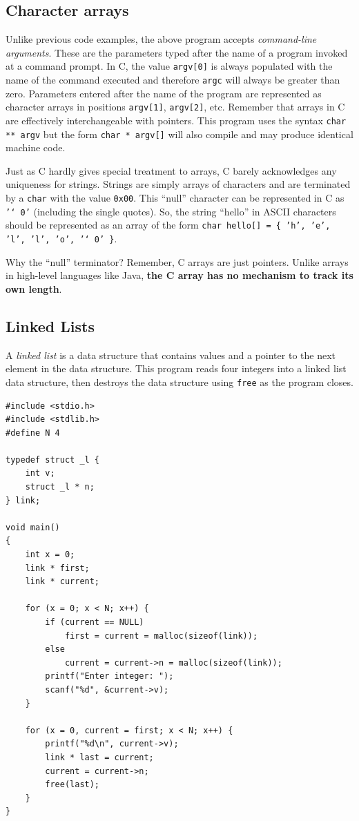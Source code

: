 \documentclass{book}
\begin{document}
\subsection{Character arrays}

Unlike previous code examples, the above program accepts \textit{command-line arguments}. These are the parameters typed after the name of a program invoked at a command prompt. In C, the value \texttt{argv[0]} is always populated with the name of the command executed and therefore \texttt{argc} will always be greater than zero. Parameters entered after the name of the program are represented as character arrays in positions \texttt{argv[1]}, \texttt{argv[2]}, etc. Remember that arrays in C are effectively interchangeable with pointers. This program uses the syntax \texttt{char ** argv} but the form \texttt{char * argv[]} will also compile and may produce identical machine code.

Just as C hardly gives special treatment to arrays, C barely acknowledges any uniqueness for strings. Strings are simply arrays of characters and are terminated by a \texttt{char} with the value \texttt{0x00}. This ``null'' character can be represented in C as \texttt{'\char`\\0'} (including the single quotes). So, the string ``hello'' in ASCII characters should be represented as an array of the form \texttt{char hello[] = \{ 'h', 'e', 'l', 'l', 'o', '\char`\\0' \}}.

Why the ``null'' terminator? Remember, C arrays are just pointers. Unlike arrays in high-level languages like Java, \textbf{the C array has no mechanism to track its own length}.

\subsection{Linked Lists}
A \textit{linked list} is a data structure that contains values and a pointer to the next element in the data structure. This program reads four integers into a linked list data structure, then destroys the data structure using \texttt{free} as the program closes.

\begin{lstlisting}[caption={A quick and simple linked list}, captionpos=b, mathescape, xleftmargin=.25in, xrightmargin=.25in]
#include <stdio.h>
#include <stdlib.h>
#define N 4

typedef struct _l {
    int v;
    struct _l * n;
} link;

void main()
{
    int x = 0;
    link * first;
    link * current;
    
    for (x = 0; x < N; x++) {
        if (current == NULL)
            first = current = malloc(sizeof(link));
        else
            current = current->n = malloc(sizeof(link));
        printf("Enter integer: ");
        scanf("%d", &current->v);
    }
    
    for (x = 0, current = first; x < N; x++) {
        printf("%d\n", current->v);
        link * last = current;
        current = current->n;
        free(last);
    }
}
\end{lstlisting}
\end{document}

